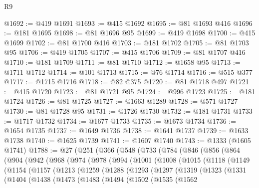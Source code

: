 \begin{lexlean}{R9}
\begin{coremodule}
@1692 := @419 @1691
@1693 := @415 @1692
@1695 := @81 @1693 @416
@1696 := @181 @1695
@1698 := @81 @1696 @95
@1699 := @419 @1698
@1700 := @415 @1699
@1702 := @81 @1700 @416
@1703 := @181 @1702
@1705 := @81 @1703 @95
@1706 := @419 @1705
@1707 := @415 @1706
@1709 := @81 @1707 @416
@1710 := @181 @1709
@1711 := @81 @1710
@1712 := @1658 @95
@1713 := @1711 @1712
@1714 := @101 @1713
@1715 := @76 @1714
@1716 := @515 @377
@1717 := @1715 @1716
@1718 := @82 @375
@1720 := @81 @1718 @497
@1721 := @415 @1720
@1723 := @81 @1721 @95
@1724 := @996 @1723
@1725 := @181 @1724
@1726 := @81 @1725
@1727 := @1663 @1289
@1728 := @571 @1727
@1730 := @81 @1728 @95
@1731 := @1726 @1730
@1732 := @181 @1731
@1733 := @1717 @1732
@1734 := @1677 @1733
@1735 := @1673 @1734
@1736 := @1654 @1735
@1737 := @1649 @1736
@1738 := @1641 @1737
@1739 := @1633 @1738
@1740 := @1625 @1739
@1741 := @1607 @1740
@1743 := @1333 (@1605 @1741)
@1788 := @27
    (@251
      (@366
        (@548
          (@733
            (@784
              (@846
                (@856
                  (@864
                    (@904
                      (@942
                        (@968
                          (@974
                            (@978
                              (@994
                                (@1001
                                  (@1008
                                    (@1015
                                      (@1118
                                        (@1149
                                          (@1154
                                            (@1157
                                              (@1213
                                                (@1259
                                                  (@1288
                                                    (@1293
                                                      (@1297
                                                        (@1319
                                                          (@1323
                                                            (@1331
                                                              (@1404
                                                                (@1438
                                                                  (@1473
                                                                    (@1483
                                                                      (@1494
                                                                        (@1502
                                                                          (@1535
                                                                            (@1562

\end{coremodule}
\end{lexlean}
